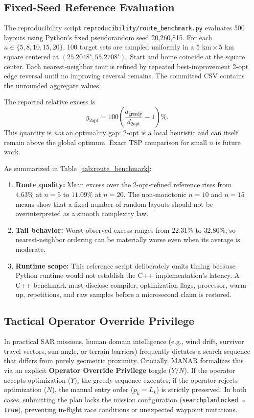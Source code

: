 \subsection{Fixed-Seed Reference Evaluation}
The reproducibility script \texttt{reproducibility/route\_benchmark.py} evaluates 500 layouts using Python's fixed pseudorandom seed 20,260,815. For each $n \in \{5,8,10,15,20\}$, 100 target sets are sampled uniformly in a $5\text{ km}\times5\text{ km}$ square centered at $(25.2048^{\circ},55.2708^{\circ})$. Start and home coincide at the square center. Each nearest-neighbor tour is refined by repeated best-improvement 2-opt edge reversal until no improving reversal remains. The committed CSV contains the unrounded aggregate values.

The reported relative excess is
\begin{equation}
g_{\mathrm{2opt}} = 100\left(\frac{d_{\mathrm{greedy}}}{d_{\mathrm{2opt}}}-1\right)\%.
\end{equation}
This quantity is \emph{not} an optimality gap: 2-opt is a local heuristic and can itself remain above the global optimum. Exact TSP comparison for small $n$ is future work.

As summarized in Table~\ref{tab:route_benchmark}:
\begin{enumerate}
    \item \textbf{Route quality:} Mean excess over the 2-opt-refined reference rises from $4.63\%$ at $n=5$ to $11.09\%$ at $n=20$. The non-monotonic $n=10$ and $n=15$ means show that a fixed number of random layouts should not be overinterpreted as a smooth complexity law.
    \item \textbf{Tail behavior:} Worst observed excess ranges from $22.31\%$ to $32.80\%$, so nearest-neighbor ordering can be materially worse even when its average is moderate.
    \item \textbf{Runtime scope:} This reference script deliberately omits timing because Python runtime would not establish the C++ implementation's latency. A C++ benchmark must disclose compiler, optimization flags, processor, warm-up, repetitions, and raw samples before a microsecond claim is restored.
\end{enumerate}

\subsection{Tactical Operator Override Privilege}
In practical SAR missions, human domain intelligence (e.g., wind drift, survivor travel vectors, sun angle, or terrain barriers) frequently dictates a search sequence that differs from purely geometric proximity. Crucially, MANAR formalizes this via an explicit \textbf{Operator Override Privilege} toggle ($Y/N$). If the operator accepts optimization ($Y$), the greedy sequence executes; if the operator rejects optimization ($N$), the manual entry order ($p_k = L_k$) is strictly preserved. In both cases, submitting the plan locks the mission configuration (\texttt{searchplanlocked = true}), preventing in-flight race conditions or unexpected waypoint mutations.

